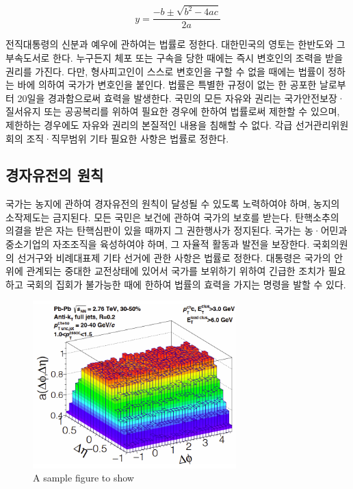 \documentclass[doctor, korean]{pnuthesis}
\begin{document}
\begin{equation}
	y = \frac{-b \pm \sqrt{b^2-4ac}}{2a}
\end{equation}

전직대통령의 신분과 예우에 관하여는 법률로 정한다. 대한민국의 영토는 한반도와 그 부속도서로 한다. 누구든지 체포 또는 구속을 당한 때에는 즉시 변호인의 조력을 받을 권리를 가진다. 다만, 형사피고인이 스스로 변호인을 구할 수 없을 때에는 법률이 정하는 바에 의하여 국가가 변호인을 붙인다. 법률은 특별한 규정이 없는 한 공포한 날로부터 20일을 경과함으로써 효력을 발생한다. 국민의 모든 자유와 권리는 국가안전보장·질서유지 또는 공공복리를 위하여 필요한 경우에 한하여 법률로써 제한할 수 있으며, 제한하는 경우에도 자유와 권리의 본질적인 내용을 침해할 수 없다. 각급 선거관리위원회의 조직·직무범위 기타 필요한 사항은 법률로 정한다.

\subsection{경자유전의 원칙}

국가는 농지에 관하여 경자유전의 원칙이 달성될 수 있도록 노력하여야 하며, 농지의 소작제도는 금지된다. 모든 국민은 보건에 관하여 국가의 보호를 받는다. 탄핵소추의 의결을 받은 자는 탄핵심판이 있을 때까지 그 권한행사가 정지된다. 국가는 농·어민과 중소기업의 자조조직을 육성하여야 하며, 그 자율적 활동과 발전을 보장한다. 국회의원의 선거구와 비례대표제 기타 선거에 관한 사항은 법률로 정한다. 대통령은 국가의 안위에 관계되는 중대한 교전상태에 있어서 국가를 보위하기 위하여 긴급한 조치가 필요하고 국회의 집회가 불가능한 때에 한하여 법률의 효력을 가지는 명령을 발할 수 있다.

\begin{figure}
	\centering
	\includegraphics[width=0.7\textwidth]{samples/samplefig1.png}
	\caption{A sample figure to show}
\end{figure}
\end{document}
